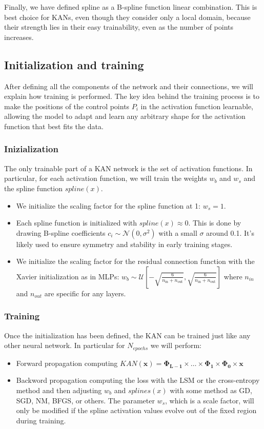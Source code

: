 \documentclass[12pt,a4paper]{article}
\begin{document}
Finally, we have defined spline as a B-spline function linear combination. This is best choice for KANs, even though they consider only a local domain, because their strength lies in their easy trainability, even as the number of points increases.


\subsection{Initialization and training}
After defining all the components of the network and their connections, we will explain how training is performed. The key idea behind the training process is to make the positions of the control points $P_i$ in the activation function learnable, allowing the model to adapt and learn any arbitrary shape for the activation function that best fits the data. \cite{KAN,kan_intro}

\subsubsection{Inizialization}
The only trainable part of a KAN network is the set of activation functions. In particular, for each activation function, we will train the weights $w_b$ and $w_s$ and the spline function $spline(x)$. 
\begin{itemize}
    \item We initialize the scaling factor for the spline function at 1: $w_s=1$. 
    \item Each spline function is initialized with $spline(x) \approx 0$.  This is done by drawing B-spline coefficients $c_i \sim \mathcal{N}(0, \sigma^2)$ with a small $\sigma$ around 0.1. It's likely used to ensure symmetry and stability in early training stages.
    \item We initialize the scaling factor for the residual connection function with the Xavier initialization as in MLPs: $w_b \sim \mathcal{U}\left[-\sqrt{\frac{6}{n_{\text{in}} + n_{\text{out}}}}, \sqrt{\frac{6}{n_{\text{in}} + n_{\text{out}}}}\right]$ where $n_{in}$ and $n_{out}$ are specific for any layers.
\end{itemize}

\subsubsection{Training}
Once the initialization has been defined, the KAN can be trained just like any other neural network. In particular for $N_{epochs}$ we will perform:
\begin{itemize}
    \item Forward propagation computing $KAN(\textbf{x}) = \boldsymbol{\Phi_{L-1}} \times \dots \times \boldsymbol{\Phi_{1}} \times \boldsymbol{\Phi_{0}} \times \textbf{x}$
    \item Backword propagation computing the loss with the LSM or the cross-entropy method and then adjusting $w_b$ and $ splines(x)$ with some method as GD, SGD, NM, BFGS, or others. The parameter $w_s$, which is a scale factor, will only be modified if the spline activation values evolve out of the fixed region during training.
\end{itemize}
\end{document}

